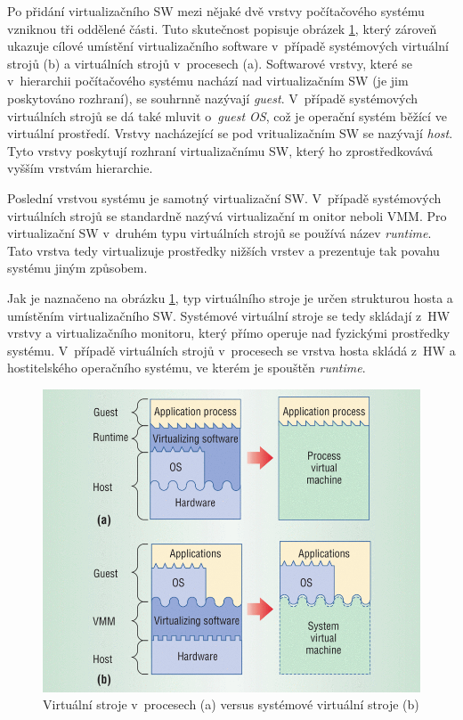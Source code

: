 Po přidání virtualizačního SW mezi nějaké dvě vrstvy počítačového systému vzniknou tři oddělené části. Tuto skutečnost popisuje
obrázek \ref{figure:system_vs_proces}, který zároveň ukazuje cílové umístění virtualizačního software v~případě systémových
virtuální strojů (b) a virtuálních strojů v~procesech (a). Softwarové vrstvy, které se v~hierarchii počítačového systému nachází
nad virtualizačním SW (je jim poskytováno rozhraní), se souhrnně nazývají \textit{guest}. V~případě systémových virtuálních strojů
se dá také mluvit o~\textit{guest OS}, což je operační systém běžící ve virtuální prostředí. Vrstvy nacházející se pod vritualizačním
SW se nazývají \textit{host}. Tyto vrstvy poskytují rozhraní virtualizačnímu SW, který ho zprostředkovává vyšším vrstvám hierarchie.

Poslední vrstvou systému je samotný virtualizační SW. V~případě systémových virtuálních strojů se standardně nazývá virtualizační m
onitor neboli VMM. Pro virtualizační SW v~druhém typu virtuálních strojů se používá název \textit{runtime}. Tato vrstva tedy
virtualizuje prostředky nižších vrstev a prezentuje tak povahu systému jiným způsobem. 

Jak je naznačeno na obrázku \ref{figure:system_vs_proces}, typ virtuálního stroje je určen strukturou hosta a umístěním virtualizačního
SW. Systémové virtuální stroje se tedy skládají z~HW vrstvy a virtualizačního monitoru, který přímo operuje nad fyzickými prostředky
systému. V~případě virtuálních strojů v~procesech se vrstva hosta skládá z~HW a hostitelského operačního systému, ve kterém je spouštěn
\textit{runtime}.
\begin{figure}
  \centering
  \includegraphics[scale=0.3]{assets/png/procesvm_vs_sysvm.png}
  \caption[Virtuální stroj v~procesu versus systémové virtuální stroje ]{Virtuální stroje v~procesech (a) versus systémové virtuální stroje (b) \cite{book:iee:vm_architecture}}
  \label{figure:system_vs_proces}
\end{figure}
